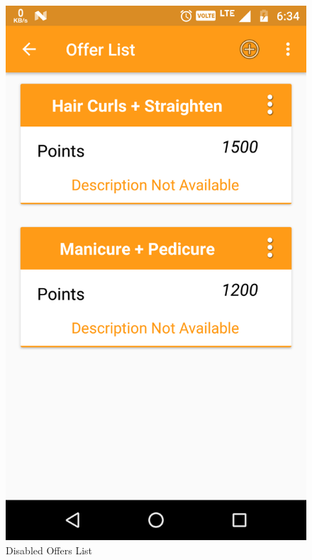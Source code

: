 \\
\begin{figure}[h]
	\centering
	\includegraphics[width=0.7\linewidth]{DisabledOffersList}
	\caption{Disabled Offers List}
\end{figure}
\pagebreak

